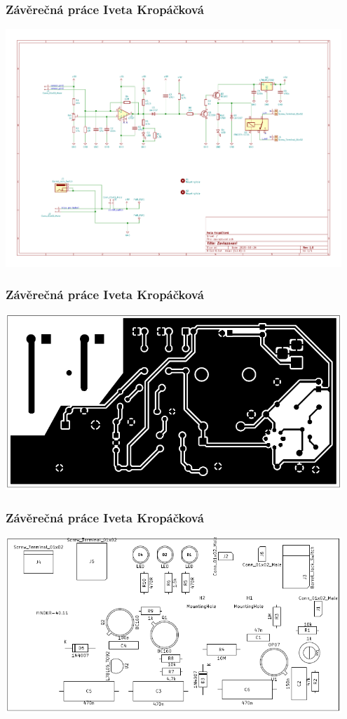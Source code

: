 \documentclass{beamer}
\begin{document}
	\begin{frame}
    \frametitle{Závěrečná práce Iveta Kropáčková}
		
		\includegraphics[page=1,width=0.95\textwidth]{pdf/KEO-Iveta_Kropackova-schema.pdf}
	
	\end{frame}
	\begin{frame}
    \frametitle{Závěrečná práce Iveta Kropáčková}
		
		\includegraphics[width=0.95\textwidth]{obr/kropackova-pcb.png}
	
	\end{frame}
	\begin{frame}
    \frametitle{Závěrečná práce Iveta Kropáčková}
		
		\includegraphics[width=0.95\textwidth]{obr/kropackova-osaz}
	
	\end{frame}
\end{document}

